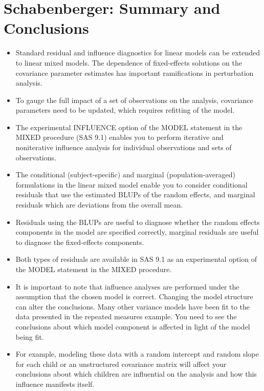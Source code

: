 \documentclass[main.tex]{subfiles}
\begin{document}
	
	\section*{Schabenberger: Summary and Conclusions}
	\begin{itemize}
		\item Standard residual and inﬂuence diagnostics for linear models can be extended to linear mixed models. The dependence of ﬁxed-effects solutions on the covariance parameter estimates has important ramiﬁcations in perturbation analysis. 
		\item To gauge the full impact of a set of observations on the analysis, covariance parameters need to be updated, which requires reﬁtting of the model. 
		\item The experimental INFLUENCE option of the MODEL statement in the MIXED procedure (SAS 9.1) enables you to perform iterative and noniterative inﬂuence analysis for individual observations and sets of observations.
		
		\item The conditional (subject-speciﬁc) and marginal (population-averaged) formulations in the linear mixed model enable you to consider conditional residuals that use the estimated BLUPs of the random effects, and marginal residuals which are deviations from the overall mean. 
		\item Residuals using the BLUPs are useful to diagnose whether the random effects components in the model are speciﬁed correctly, marginal residuals are useful to diagnose the ﬁxed-effects components. 
		\item Both types of residuals are available in SAS 9.1 as an experimental option of the MODEL statement in the MIXED procedure.
		
		\item It is important to note that influence analyses are performed under the assumption that the chosen model is correct. Changing the model structure can alter the conclusions. Many other variance models have been ﬁt to the data presented in the repeated measures example. You need to see the conclusions about which model component is affected in light of the model being fit.
		\item  For example, modeling these data with a random intercept and random slope for each child or an unstructured covariance matrix will affect your conclusions about which children are inﬂuential on the analysis and how this influence manifests itself.
	\end{itemize}
	
\end{document}
